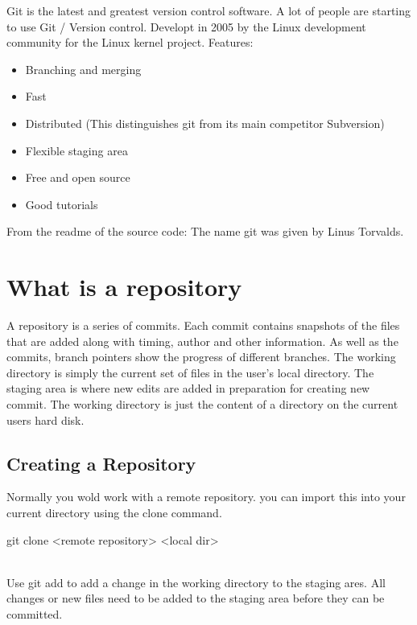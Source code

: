 \documentclass[a4paper,10pt]{scrartcl}
\begin{document}
Git is the latest and greatest version control software. A lot of people are
starting to use Git / Version control.
Developt in 2005 by the Linux development community for the Linux kernel
project.
Features:
\begin{itemize}
    \item Branching and merging
    \item Fast
    \item Distributed (This distinguishes git from its main competitor
        Subversion)
    \item Flexible staging area
    \item Free and open source
    \item Good tutorials
\end{itemize}

From the readme of the source code:
The name git was given by Linus Torvalds.

\section{What is a repository}%
\label{sec:what_is_a_repository}

A repository is a series of commits.
Each commit contains snapshots of the files that are added along with timing,
author and other information. As well as the commits, branch pointers show the
progress of different branches. The working directory is simply the current set
of files in the user's local directory. The staging area is where new edits are
added in preparation for creating new commit. The working directory is just the
content of a directory on the current users hard disk.

\subsection{Creating a Repository}%
\label{sub:creating_a_repository}

Normally you wold work with a remote repository. you can import this into your
current directory using the clone command.\\
\begin{indent}
    git clone <remote repository> <local dir>
\end{indent}\\

Use git add to add a change in the working directory to the staging ares. All
changes or new files need to be added to the staging area before they can be
committed.
\end{document}
